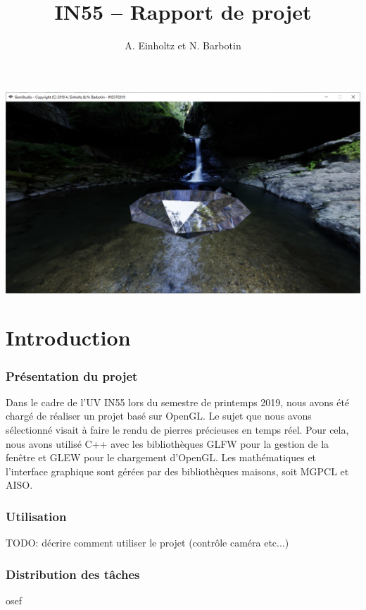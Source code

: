 \documentclass[a4paper,12pt]{article}
\title{IN55 -- Rapport de projet}
\author{A. Einholtz et N. Barbotin}
\begin{document}
\setlength{\parindent}{0cm}
\setlength{\parskip}{8pt}

\begin{center}
    \Huge\thetitle

    \vfill
    \includegraphics[width=15cm]{screenshot.jpg}
    \vfill
\end{center}

\newpage
\tableofcontents

\newpage
\part{Introduction}
\section{Présentation du projet}
Dans le cadre de l'UV IN55 lors du semestre de printemps 2019, nous avons été chargé de réaliser
un projet basé sur OpenGL. Le sujet que nous avons sélectionné visait à faire le rendu de pierres
précieuses en temps réel. Pour cela, nous avons utilisé C++ avec les bibliothèques GLFW pour la
gestion de la fenêtre et GLEW pour le chargement d'OpenGL. Les mathématiques et l'interface graphique
sont gérées par des bibliothèques maisons, soit MGPCL et AISO.

\section{Utilisation}
TODO: décrire comment utiliser le projet (contrôle caméra etc...)

\section{Distribution des tâches}
osef
\end{document}
